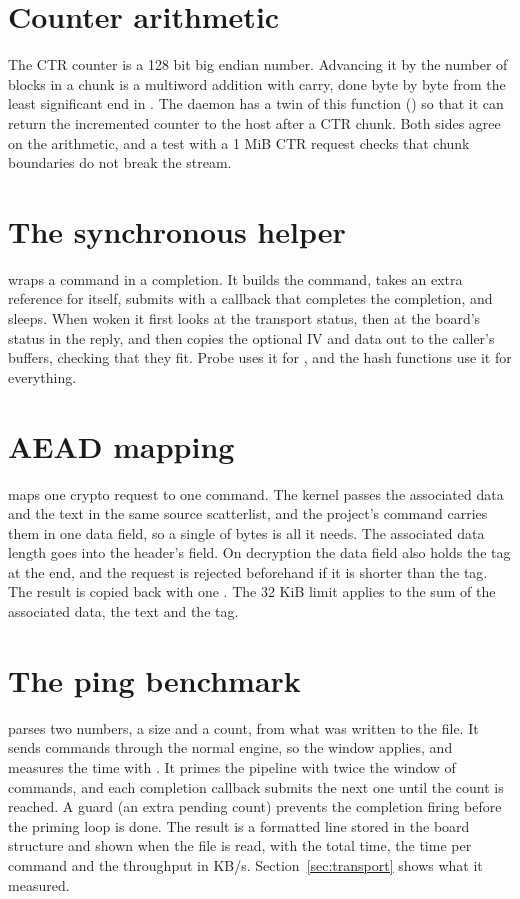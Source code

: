 \section{Counter arithmetic}

The CTR counter is a 128 bit big endian number. Advancing it by the number of blocks in a chunk is a multiword addition with carry, done byte by byte from the least significant end in . The daemon has a twin of this function () so that it can return the incremented counter to the host after a CTR chunk. Both sides agree on the arithmetic, and a test with a 1 MiB CTR request checks that chunk boundaries do not break the stream.

\section{The synchronous helper}

 wraps a command in a completion. It builds the command, takes an extra reference for itself, submits with a callback that completes the completion, and sleeps. When woken it first looks at the transport status, then at the board's status in the reply, and then copies the optional IV and data out to the caller's buffers, checking that they fit. Probe uses it for , and the hash functions use it for everything.

\section{AEAD mapping}

 maps one crypto request to one command. The kernel passes the associated data and the text in the same source scatterlist, and the project's command carries them in one data field, so a single  of  bytes is all it needs. The associated data length goes into the header's  field. On decryption the data field also holds the tag at the end, and the request is rejected beforehand if it is shorter than the tag. The result is copied back with one . The 32 KiB limit applies to the sum of the associated data, the text and the tag.

\section{The ping benchmark}

 parses two numbers, a size and a count, from what was written to the file. It sends  commands through the normal engine, so the window applies, and measures the time with . It primes the pipeline with twice the window of commands, and each completion callback submits the next one until the count is reached. A guard (an extra pending count) prevents the completion firing before the priming loop is done. The result is a formatted line stored in the board structure and shown when the file is read, with the total time, the time per command and the throughput in KB/s. Section~\ref{sec:transport} shows what it measured.

